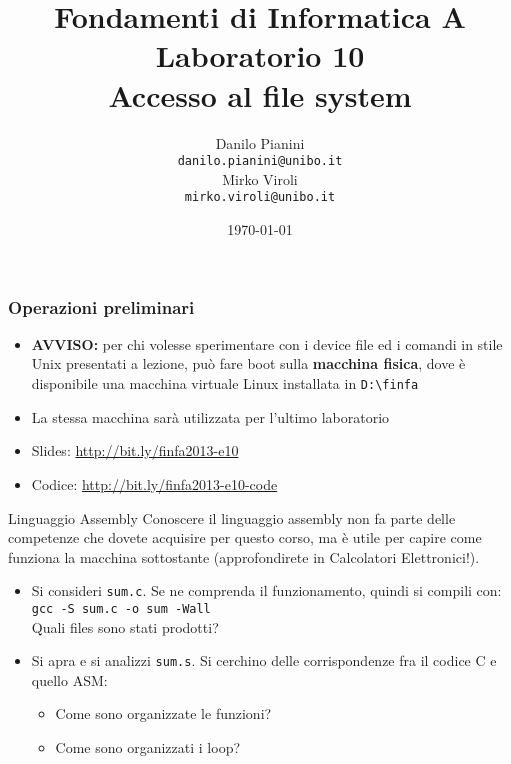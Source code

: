 \documentclass{beamer}
\begin{document}
\title[Lab1 - FV]{Fondamenti di Informatica A \\ Laboratorio 10 \\ Accesso al file system}
\author[Danilo Pianini]{Danilo Pianini\\\texttt{danilo.pianini@unibo.it} \\ \vspace{3pt} Mirko Viroli\\\texttt{mirko.viroli@unibo.it} }
\date[\today]{\today}

\frame{\titlepage} 

\begin{frame}[fragile]
\frametitle{Operazioni preliminari}
\begin{itemize}
 \item \textbf{AVVISO:} per chi volesse sperimentare con i device file ed i comandi in stile Unix presentati a lezione, può fare boot sulla \textbf{macchina fisica}, dove è disponibile una macchina virtuale Linux installata in \texttt{D:\textbackslash{}finfa}
 \item La stessa macchina sarà utilizzata per l'ultimo laboratorio
 \item Slides: \url{http://bit.ly/finfa2013-e10}
 \item Codice: \url{http://bit.ly/finfa2013-e10-code}
\end{itemize}
\end{frame}

\begin{frame}[fragile]{Linguaggio Assembly}
Conoscere il linguaggio assembly non fa parte delle competenze che dovete acquisire per questo corso, ma è utile per capire come funziona la macchina sottostante (approfondirete in Calcolatori Elettronici!).
\begin{itemize}
 \item Si consideri \texttt{sum.c}. Se ne comprenda il funzionamento, quindi si compili con: \\ \texttt{gcc -S sum.c -o sum -Wall} \\ Quali files sono stati prodotti?
 \item Si apra e si analizzi \texttt{sum.s}. Si cerchino delle corrispondenze fra il codice C e quello ASM:
  \begin{itemize}
    \item Come sono organizzate le funzioni?
    \item Come sono organizzati i loop?
  \end{itemize}
\end{itemize}
\end{frame}
\end{document}
